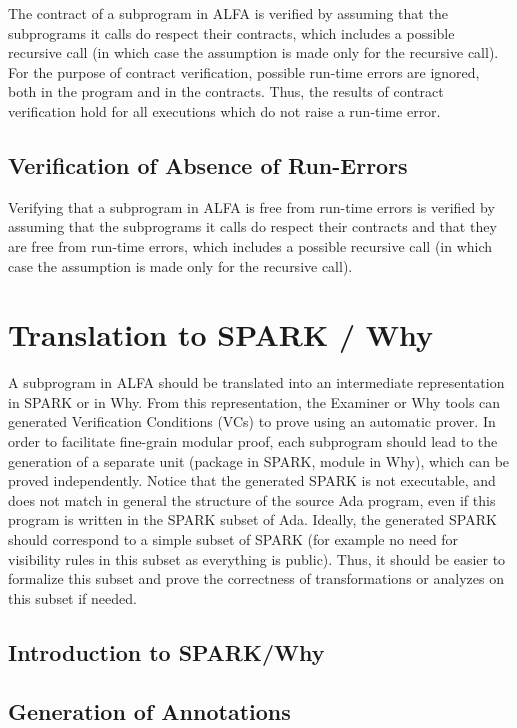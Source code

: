\documentclass{article}
\begin{document}
The contract of a subprogram in ALFA is verified by assuming that the
subprograms it calls do respect their contracts, which includes a possible
recursive call (in which case the assumption is made only for the recursive
call). For the purpose of contract verification, possible run-time errors are
ignored, both in the program and in the contracts. Thus, the results of
contract verification hold for all executions which do not raise a run-time
error.

\subsection{Verification of Absence of Run-Errors}

Verifying that a subprogram in ALFA is free from run-time errors is verified by
assuming that the subprograms it calls do respect their contracts and that they
are free from run-time errors, which includes a possible recursive call (in
which case the assumption is made only for the recursive call).

\section{Translation to SPARK / Why}

A subprogram in ALFA should be translated into an intermediate representation
in SPARK or in Why. From this representation, the Examiner or Why tools can
generated Verification Conditions (VCs) to prove using an automatic prover.  In
order to facilitate fine-grain modular proof, each subprogram should lead to
the generation of a separate unit (package in SPARK, module in Why), which can
be proved independently. Notice that the generated SPARK is not executable, and
does not match in general the structure of the source Ada program, even if this
program is written in the SPARK subset of Ada. Ideally, the generated SPARK
should correspond to a simple subset of SPARK (for example no need for
visibility rules in this subset as everything is public). Thus, it should be
easier to formalize this subset and prove the correctness of transformations or
analyzes on this subset if needed.

\subsection{Introduction to SPARK/Why}

\subsection{Generation of Annotations}
\end{document}
